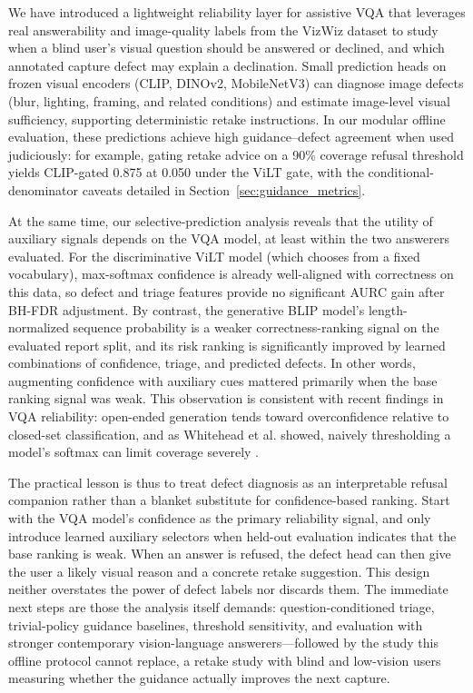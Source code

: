 \documentclass{ieeeaccess}
\newcommand{\arr}{\mathrm{GDMR}}
\newcommand{\frr}{\mathrm{AIRB}}
\newcommand{\clip}{CLIP}
\newcommand{\dinov}{DINOv2}
\newcommand{\mobilenet}{MobileNetV3}
\newcommand{\vilt}{ViLT}
\newcommand{\blip}{BLIP}
\begin{document}
We have introduced a lightweight reliability layer for assistive VQA that leverages real answerability and image-quality labels from the VizWiz dataset to study when a blind user's visual question should be answered or declined, and which annotated capture defect may explain a declination. Small prediction heads on frozen visual encoders (\clip{}, \dinov{}, \mobilenet{}) can diagnose image defects (blur, lighting, framing, and related conditions) and estimate image-level visual sufficiency, supporting deterministic retake instructions. In our modular offline evaluation, these predictions achieve high guidance--defect agreement when used judiciously: for example, gating retake advice on a 90\% coverage refusal threshold yields \clip{}-gated \arr{} 0.875 at \frr{} 0.050 under the \vilt{} gate, with the conditional-denominator caveats detailed in Section~\ref{sec:guidance_metrics}.

At the same time, our selective-prediction analysis reveals that the utility of auxiliary signals depends on the VQA model, at least within the two answerers evaluated. For the discriminative \vilt{} model (which chooses from a fixed vocabulary), max-softmax confidence is already well-aligned with correctness on this data, so defect and triage features provide no significant AURC gain after BH-FDR adjustment. By contrast, the generative \blip{} model's length-normalized sequence probability is a weaker correctness-ranking signal on the evaluated report split, and its risk ranking is significantly improved by learned combinations of confidence, triage, and predicted defects. In other words, augmenting confidence with auxiliary cues mattered primarily when the base ranking signal was weak. This observation is consistent with recent findings in VQA reliability: open-ended generation tends toward overconfidence relative to closed-set classification, and as Whitehead et al. showed, naively thresholding a model's softmax can limit coverage severely \cite{whitehead2022reliable}.

The practical lesson is thus to treat defect diagnosis as an interpretable refusal companion rather than a blanket substitute for confidence-based ranking. Start with the VQA model's confidence as the primary reliability signal, and only introduce learned auxiliary selectors when held-out evaluation indicates that the base ranking is weak. When an answer is refused, the defect head can then give the user a likely visual reason and a concrete retake suggestion. This design neither overstates the power of defect labels nor discards them. The immediate next steps are those the analysis itself demands: question-conditioned triage, trivial-policy guidance baselines, threshold sensitivity, and evaluation with stronger contemporary vision-language answerers---followed by the study this offline protocol cannot replace, a retake study with blind and low-vision users measuring whether the guidance actually improves the next capture.
\end{document}
